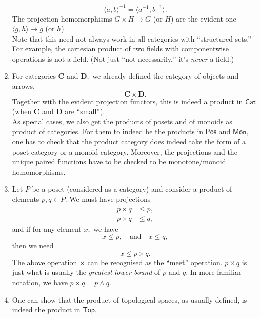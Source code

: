 \documentclass[11pt,leqno,landscape,semhelv]{seminar}
\numberwithin{equation}{section}
\theoremstyle{definition}
\numberwithin{thm}{section}
\numberwithin{equation}{section}
\begin{document}
\begin{enumerate}
\begin{equation*}
		\langle a, b\rangle^{-1} = \langle a^{-1}, b^{-1}\rangle.
	\end{equation*}
	The projection homomorphisms $G\times H \to G$ (or $H$) are the evident one $\langle g, h\rangle \mapsto g$ (or $h$).\\
	Note that this need not always work in all categories with ``structured sets.'' For example, the cartesian product of two fields with componentwise operations is not a field. (Not just ``not necessarily,'' it's \emph{never} a field.)
	\item For categories $\mathbf{C}$ and $\mathbf{D},$	we already defined the category of objects and arrows,
	\begin{equation*} 
		\mathbf{C} \times \mathbf{D}.
	\end{equation*}
	Together with the evident projection functors, this is indeed a product in $\mathsf{Cat}$ (when $\mathbf{C}$ and $\mathbf{D}$ are ``small'').\\
	As special cases, we also get the products of posets and of monoids as product of categories. For them to indeed be the products in $\mathsf{Pos}$ and $\mathsf{Mon},$ one has to check that the product category does indeed take the form of a poset-category or a monoid-category. Moreover, the projections and the unique paired functions have to be checked to be monotone/monoid homomorphisms.
	\item Let $P$ be a poset (considered as a category) and consider a product of elements $p, q \in P.$ We must have projections
	\begin{align*} 
		p \times q &\le p,\\
		p \times q &\le q,
	\end{align*}
	and if for any element $x,$ we have
	\begin{equation*} 
		x \le p, \quad \text{and} \quad x \le q,
	\end{equation*}
	then we need
	\begin{equation*} 
		x \le p \times q.
	\end{equation*}
	The above operation $\times$ can be recognised as the ``meet'' operation. $p \times q$ is just what is usually the \emph{greatest lower bound} of $p$ and $q.$ In more familiar notation, we have $p\times q = p \wedge q.$
	\item One can show that the product of topological spaces, as usually defined, is indeed the product in $\mathsf{Top}.$
\end{enumerate}
%
%
\end{document}
